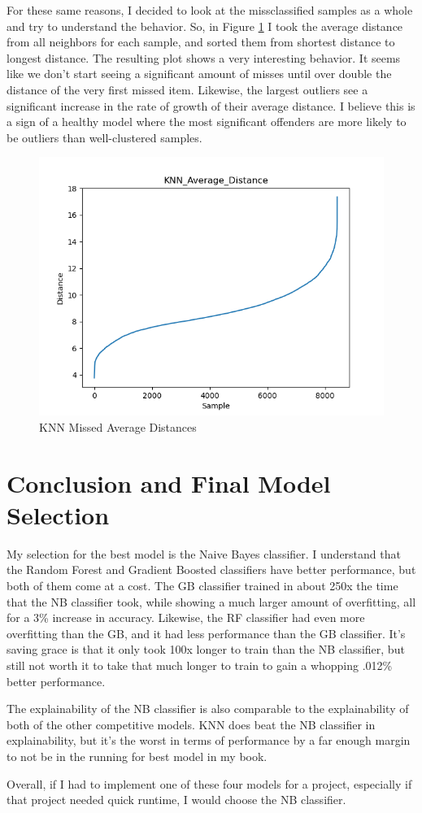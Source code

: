 \documentclass[12pt]{article}
\begin{document}
For these same reasons, I decided to look at the missclassified samples as a whole and try to understand the behavior.
So, in Figure \ref{figure6} I took the average distance from all neighbors for each sample, and sorted them from shortest 
distance to longest distance. The resulting plot shows a very interesting behavior. It seems like we don't start seeing a 
significant amount of misses until over double the distance of the very first missed item. Likewise, the largest outliers
see a significant increase in the rate of growth of their average distance. I believe this is a sign of a healthy model 
where the most significant offenders are more likely to be outliers than well-clustered samples.
\begin{figure}
  \includegraphics[width=.95\textwidth]{../results/knn/KNN_Average_Distance.png}
  \caption{KNN Missed Average Distances}
  \label{figure6}
\end{figure}

\section{Conclusion and Final Model Selection}

My selection for the best model is the Naive Bayes classifier. I understand that the Random Forest and Gradient Boosted
classifiers have better performance, but both of them come at a cost. The GB classifier trained in about 250x the time that 
the NB classifier took, while showing a much larger amount of overfitting, all for a 3\% increase in accuracy. Likewise,
the RF classifier had even more overfitting than the GB, and it had less performance than the GB classifier. It's saving 
grace is that it only took 100x longer to train than the NB classifier, but still not worth it to take that much longer 
to train to gain a whopping .012\% better performance. 

The explainability of the NB classifier is also comparable to the explainability of both of the other competitive models.
KNN does beat the NB classifier in explainability, but it's the worst in terms of performance by a far enough margin to not 
be in the running for best model in my book. 

Overall, if I had to implement one of these four models for a project, especially if that project needed quick runtime, 
I would choose the NB classifier.
\end{document}
